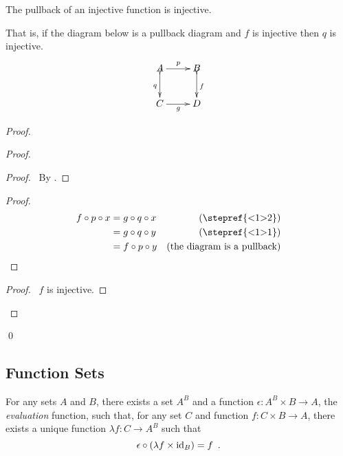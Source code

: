 \begin{prop}
  \label{prop:sets:pullback:injective}
 The pullback of an injective function is injective.

 That is, if the diagram below is a pullback diagram and $f$ is injective
then $q$ is injective.
\[      \xymatrix{ A \ar[r]^p \ar@{>->}[d]_q & B \ar@{>->}[d]^f \\
     C \ar[r]_g & D } \]
\end{prop}

\begin{proof}
 \pf
 \begin{proof}
   \begin{proof}
     \pf\ By .
   \end{proof}
   \begin{proof}
     \pf
     \begin{align*}
       f \circ p \circ x & = g \circ q \circ x & (\text{\stepref{<1>2}}) \\
       & = g \circ q \circ y & (\text{\stepref{<1>1}}) \\
       & = f \circ p \circ y & (\text{the diagram is a pullback})
     \end{align*}
   \end{proof}
   \begin{proof}
     \pf\ $f$ is injective.
   \end{proof}
 \end{proof}
 \qed
\end{proof}

\subsection{Function Sets}

\begin{ax}
  For any sets $A$ and $B$, there exists a set $A^B$ and a function $\epsilon
  : A^B \times B \rightarrow A$, the \emph{evaluation} function, such that,
  for any set $C$ and function $f : C \times B \rightarrow A$, there exists a
  unique function $\lambda f : C \rightarrow A^B$ such that
  \[ \epsilon \circ (\lambda f \times \mathrm{id}_{B}) = f \enspace . \]
\end{ax}

